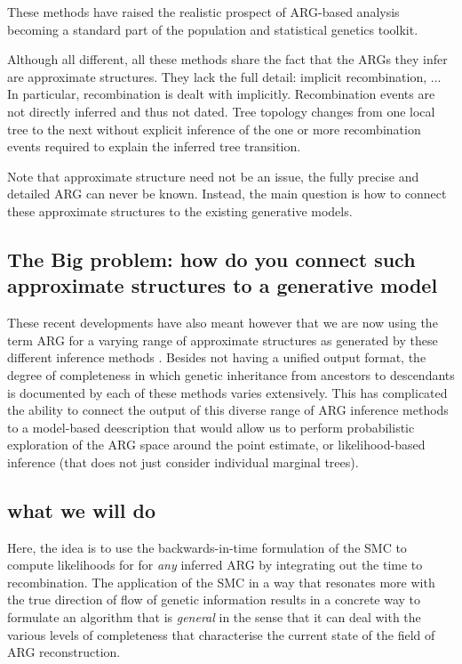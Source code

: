 \documentclass{article}
\begin{document}



These methods
have raised the realistic prospect of ARG-based analysis becoming a standard 
part of the population and statistical genetics toolkit.

Although all different, all these methods share the fact that the ARGs they infer 
are approximate structures.
They lack the full detail: implicit recombination, ...
In particular, recombination is dealt with implicitly. Recombination events are 
not directly inferred and thus not dated. Tree topology changes from one local 
tree to the next without explicit inference of the one or more recombination 
events required to explain the inferred tree transition.

Note that approximate structure need not be an issue, the fully precise and detailed 
ARG can never be known. Instead, the main question is how to connect these 
approximate structures to the existing generative models.

\subsection{The Big problem: how do you connect such approximate structures to a generative model} 

These recent developments have also meant however that
we are now using the term ARG for a varying range of approximate structures 
as generated by these different inference methods \citep{wong_a-general_2023}. 
Besides not having a unified output format, the degree of completeness 
in which genetic inheritance from ancestors to 
descendants is documented by each of these methods varies extensively.
This has complicated the ability to connect the output of this diverse range of 
ARG inference methods to a model-based deescription that would allow us to perform  
probabilistic exploration of the ARG space around the point estimate, 
or likelihood-based inference (that does not just consider individual marginal trees).


\subsection{what we will do}

Here, the idea is to use the backwards-in-time formulation of the SMC to 
compute likelihoods for for \textit{any} inferred ARG 
by integrating out the time to recombination.
The application of the SMC in a way that resonates more 
with the true direction of flow of genetic information 
results in a concrete way to formulate an algorithm 
that is \textit{general} in the sense that it can deal with the various levels of 
completeness that characterise the current state of the field of ARG reconstruction.
\end{document}
